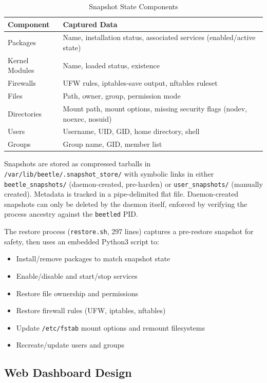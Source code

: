 \begin{table}[H]
\centering
\caption{Snapshot State Components}
\begin{tabular}{|l|p{8cm}|}
\hline
\textbf{Component} & \textbf{Captured Data} \\
\hline
Packages & Name, installation status, associated services (enabled/active state) \\
\hline
Kernel Modules & Name, loaded status, existence \\
\hline
Firewalls & UFW rules, iptables-save output, nftables ruleset \\
\hline
Files & Path, owner, group, permission mode \\
\hline
Directories & Mount path, mount options, missing security flags (nodev, noexec, nosuid) \\
\hline
Users & Username, UID, GID, home directory, shell \\
\hline
Groups & Group name, GID, member list \\
\hline
\end{tabular}
\label{tab:snapshot}
\end{table}

Snapshots are stored as compressed tarballs in \texttt{/var/lib/beetle/.snapshot\_store/} with symbolic links in either \texttt{beetle\_snapshots/} (daemon-created, pre-harden) or \texttt{user\_snapshots/} (manually created). Metadata is tracked in a pipe-delimited flat file. Daemon-created snapshots can only be deleted by the daemon itself, enforced by verifying the process ancestry against the \texttt{beetled} PID.

The restore process (\texttt{restore.sh}, 297 lines) captures a pre-restore snapshot for safety, then uses an embedded Python3 script to:
\begin{itemize}[noitemsep]
    \item Install/remove packages to match snapshot state
    \item Enable/disable and start/stop services
    \item Restore file ownership and permissions
    \item Restore firewall rules (UFW, iptables, nftables)
    \item Update \texttt{/etc/fstab} mount options and remount filesystems
    \item Recreate/update users and groups
\end{itemize}

\subsection{Web Dashboard Design}

